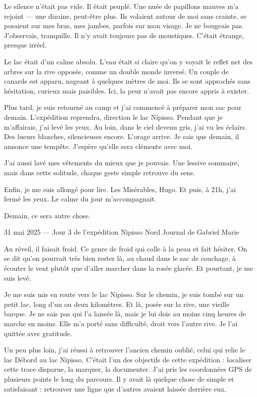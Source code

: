 Le silence n’était pas vide. Il était peuplé. Une nuée de papillons mauves m’a rejoint — une dizaine, peut-être plus. Ils volaient autour de moi sans crainte, se posaient sur mes bras, mes jambes, parfois sur mon visage. Je ne bougeais pas. J’observais, tranquille. Il n’y avait toujours pas de moustiques. C’était étrange, presque irréel.

Le lac était d’un calme absolu. L’eau était si claire qu’on y voyait le reflet net des arbres sur la rive opposée, comme un double monde inversé. Un couple de canards est apparu, nageant à quelques mètres de moi. Ils se sont approchés sans hésitation, curieux mais paisibles. Ici, la peur n’avait pas encore appris à exister.

Plus tard, je suis retourné au camp et j’ai commencé à préparer mon sac pour demain. L’expédition reprendra, direction le lac Nipisso. Pendant que je m’affairais, j’ai levé les yeux. Au loin, dans le ciel devenu gris, j’ai vu les éclairs. Des lueurs blanches, silencieuses encore. L’orage arrive. Je sais que demain, il annonce une tempête. J’espère qu’elle sera clémente avec moi.

J’ai aussi lavé mes vêtements du mieux que je pouvais. Une lessive sommaire, mais dans cette solitude, chaque geste simple retrouve du sens.

Enfin, je me suis allongé pour lire. Les Misérables, Hugo. Et puis, à 21h, j’ai fermé les yeux. Le calme du jour m’accompagnait.

Demain, ce sera autre chose.



31 mai 2025 — Jour 3 de l’expédition Nipisso Nord
Journal de Gabriel Marie

Au réveil, il faisait froid. Ce genre de froid qui colle à la peau et fait hésiter. On se dit qu’on pourrait très bien rester là, au chaud dans le sac de couchage, à écouter le vent plutôt que d’aller marcher dans la rosée glacée. Et pourtant, je me suis levé.

Je me suis mis en route vers le lac Nipisso. Sur le chemin, je suis tombé sur un petit lac, long d’un ou deux kilomètres. Et là, posée sur la rive, une vieille barque. Je ne sais pas qui l’a laissée là, mais je lui dois au moins cinq heures de marche en moins. Elle m’a porté sans difficulté, droit vers l’autre rive. Je l’ai quittée avec gratitude.

Un peu plus loin, j’ai réussi à retrouver l’ancien chemin oublié, celui qui relie le lac Débord au lac Nipisso. C’était l’un des objectifs de cette expédition : localiser cette trace disparue, la marquer, la documenter. J’ai pris les coordonnées GPS de plusieurs points le long du parcours. Il y avait là quelque chose de simple et satisfaisant : retrouver une ligne que d’autres avaient laissée derrière eux.

